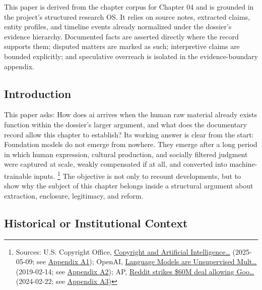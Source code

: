 \documentclass[
  american,
  11pt,
  letterpaper,
]{article}
\begin{document}
This paper is derived from the chapter corpus for Chapter 04 and is
grounded in the project's structured research OS. It relies on source
notes, extracted claims, entity profiles, and timeline events already
normalized under the dossier's evidence hierarchy. Documented facts are
asserted directly where the record supports them; disputed matters are
marked as such; interpretive claims are bounded explicitly; and
speculative overreach is isolated in the evidence-boundary appendix.

\subsection{Introduction}\label{introduction-4}

This paper asks: How does ai arrives when the human raw material already
exists function within the dossier's larger argument, and what does the
documentary record allow this chapter to establish? Its working answer
is clear from the start: Foundation models do not emerge from nowhere.
They emerge after a long period in which human expression, cultural
production, and socially filtered judgment were captured at scale,
weakly compensated if at all, and converted into machine-trainable
inputs. \footnote{Sources: U.S. Copyright Office,
  \href{https://copyright.gov/ai/Copyright-and-Artificial-Intelligence-Part-3-Generative-AI-Training-Report-Pre-Publication-Version.pdf}{Copyright
  and Artificial Intelligence\ldots{}} (2025-05-09; see
  \hyperref[ch-04-appendix-a1-copyright-and-artificial-intelligence-part-3-generative-ai-training-pre-publication-version]{Appendix
  A1}); OpenAI,
  \href{https://cdn.openai.com/better-language-models/language_models_are_unsupervised_multitask_learners.pdf}{Language
  Models are Unsupervised Mult\ldots{}} (2019-02-14; see
  \hyperref[ch-04-appendix-a2-language-models-are-unsupervised-multitask-learners]{Appendix
  A2}); AP,
  \href{https://apnews.com/article/a7f131c7cb4225307134ef21d3c6a708}{Reddit
  strikes \$60M deal allowing Goo\ldots{}} (2024-02-22; see
  \hyperref[ch-04-appendix-a3-reddit-strikes-60m-deal-allowing-google-to-train-ai-models-on-its-posts-unveils-ipo-plans]{Appendix
  A3})} The objective is not only to recount developments, but to show
why the subject of this chapter belongs inside a structural argument
about extraction, enclosure, legitimacy, and reform.

\subsection{Historical or Institutional
Context}\label{historical-or-institutional-context-4}
\end{document}
